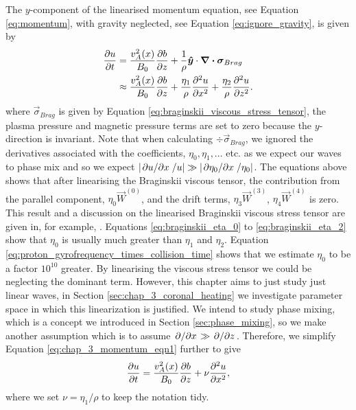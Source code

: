 The $y$-component of the linearised momentum equation, see Equation \eqref{eq:momentum}, with gravity neglected, see Equation \eqref{eq:ignore_gravity}, is given by
\begin{equation}
    \label{eq:chap_3_momentum_eqn1}
    \begin{aligned}
    \pdv{u}{t} &= \frac{v_A^2(x)}{B_0}\pdv{b}{z} + \frac{1}{\rho}\boldsymbol{\hat{y}}\cdot\div{\boldsymbol{\sigma}_{Brag}} \\
    &\approx\frac{v_A^2(x)}{B_0}\pdv{b}{z} +\frac{\eta_1}{\rho} \pdv[2]{u}{x} + \frac{\eta_2}{\rho} \pdv[2]{u}{z}.
    \end{aligned}
\end{equation}
where $\vec{\sigma}_{Brag}$ is given by Equation \eqref{eq:braginskii_viscous_stress_tensor}, the plasma pressure and magnetic pressure terms are set to zero because the $y$-direction is invariant. Note that when calculating $\div\vec{\sigma}_{Brag}$, we ignored the derivatives associated with the coefficients, $\eta_0,\eta_1, ...$ etc. as we expect our waves to phase mix and so we expect $\abs{\pdv*{u}{x}/u}\gg\abs{\pdv*{\eta_0}{x}/\eta_0}$. The equations above shows that after linearising the Braginskii viscous tensor, the contribution from the parallel component, $\eta_0\vec{W}^{(0)}$, and the drift terms, $\eta_3\vec{W}^{(3)}$, $\eta_4\vec{W}^{(4)}$ is zero. This result and a discussion on the linearised Braginskii viscous stress tensor are given in, for example, \citet{Ruderman2000,Mocanu2008}. Equations \eqref{eq:braginskii_eta_0} to \eqref{eq:braginskii_eta_2} show that $\eta_0$ is usually much greater than $\eta_1$ and $\eta_2$. Equation \eqref{eq:proton_gyrofrequency_times_collision_time} shows that we estimate $\eta_0$ to be a factor $10^{10}$ greater. By linearising the viscous stress tensor we could be neglecting the dominant term. However, this chapter aims to just study just linear waves, in Section \ref{sec:chap_3_coronal_heating} we investigate parameter space in which this linearization is justified. We intend to study phase mixing, which is a concept we introduced in Section \ref{sec:phase_mixing}, so we make another assumption which is to assume $\pdv*{}{x}\gg\pdv*{}{z}$. Therefore, we simplify Equation \eqref{eq:chap_3_momentum_eqn1} further to give
\begin{equation}
    \label{eq:chap_3_momentum_eqn2}
    \pdv{u}{t}=\frac{v_A^2(x)}{B_0}\pdv{b}{z} +\nu\pdv[2]{u}{x},
\end{equation}
where we set $\nu = \eta_1/\rho$ to keep the notation tidy.

